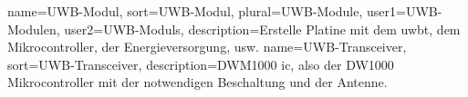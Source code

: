 {
	name={UWB-Modul}, sort={UWB-Modul}, plural={UWB-Module},
	user1={UWB-Modulen}, user2={UWB-Moduls},
	description={Erstelle Platine mit dem \gls{uwbt}, dem Mikrocontroller, der Energieversorgung, usw.}
}
{
	name={UWB-Transceiver}, sort={UWB-Transceiver},
	description={DWM1000 \gls{ic}, also der DW1000 Mikrocontroller mit der notwendigen Beschaltung und der Antenne.}
}





